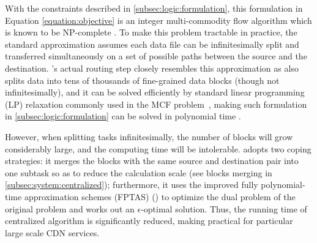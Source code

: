 With the constraints described in \Section\ref{subsec:logic:formulation}, this formulation in Equation \ref{equation:objective} is an integer multi-commodity flow algorithm which is known to be NP-complete \cite{garg1997primal}.
To make this problem tractable in practice,
the standard approximation assumes each data file can be infinitesimally split and transferred simultaneously on a set of possible paths between the source and the destination.
\name's actual routing step closely resembles this approximation as \name also splits data into tens of thousands of fine-grained data blocks (though not infinitesimally), and it can be solved efficiently by standard linear programming (LP) relaxation commonly used in the MCF problem~\cite{garg2007faster}, 
making such formulation in \Section\ref{subsec:logic:formulation} can be solved in polynomial time \cite{reed2012traffic}.

However, when splitting tasks infinitesimally, the number of blocks will grow considerably large, and the computing time will be intolerable. \name adopts two coping strategies: it merges the blocks with the same source and destination pair into one subtask so as to reduce the calculation scale (see blocks merging in \Section\ref{subsec:system:centralized}); furthermore, it uses the improved fully polynomial-time approximation schemes (FPTAS) (\cite{fleischer2000approximating}) to optimize the dual problem of the original problem and works out an $\epsilon$-optimal solution. Thus, the running time of centralized algorithm is significantly reduced, making \name practical for particular large scale CDN services.